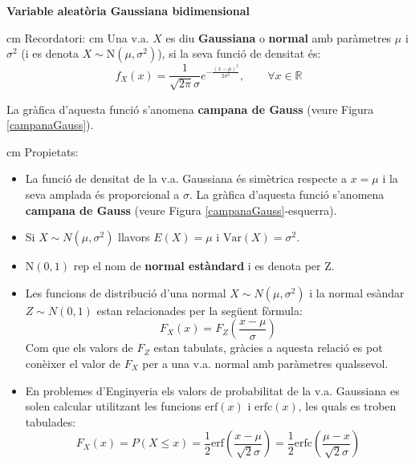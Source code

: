 \documentclass{article}
\newcommand\R{\mathbb{R}}
\begin{document}
\noindent
\textbf{\large Variable aleat\`oria Gaussiana bidimensional}

 cm
\noindent
Recordatori:
 cm
Una v.a. $X$ es diu \textbf{Gaussiana} o \textbf{normal} amb par\`ametres $\mu$ i $\sigma^2$
(i es denota $X \sim \mathrm{N}(\mu, \sigma^2)$), si la seva funci\'o de densitat \'es:
\[
f_X(x)=\frac{1}{\sqrt{2\pi}\sigma}e^{-\frac{(x-\mu)^2}{2 \sigma^2}} , 
\qquad \forall x \in \R
\]

\noindent
La gr\`afica d'aquesta funci\'o s'anomena {\bf campana de Gauss} (veure Figura \ref{campanaGauss}).

 cm
\noindent
Propietats:
\begin{itemize}
\item La funci\'o de densitat de la v.a. Gaussiana \'es sim\`etrica respecte a $x=\mu$ i la seva
amplada \'es proporcional a $\sigma$. La gr\`afica d'aquesta funci\'o s'anomena 
{\bf campana de Gauss} (veure Figura \ref{campanaGauss}-esquerra).

\item Si $X \sim N(\mu, \sigma^2)$ llavors $E(X)=\mu$ i $\mathrm{Var}(X)=\sigma^2$.

\item $\mathrm{N}(0, 1)$ rep el nom de {\bf normal est\`andard} i es denota per $\mathrm{Z}$.

\item Les funcions de distribuci\'o d'una normal $X \sim N(\mu, \sigma^2)$ i
la normal es\`andar $Z \sim N(0, 1)$ estan relacionades per la seg\"uent f\`ormula:
\[
F_X(x)=F_Z(\frac{x-\mu}{\sigma})
\]
Com que els valors de $F_Z$ estan tabulats, gr\`acies a aquesta relaci\'o 
es pot con\`eixer el valor de $F_X$ per a una v.a. normal amb par\`ametres qualssevol.

\item En problemes d'Enginyeria els valors de probabilitat de la v.a. Gaussiana es 
solen calcular utilitzant les funcions $\mathrm{erf}(x)$ i $\mathrm{erfc}(x)$, 
les quals es troben tabulades:
\[
F_X(x)=P(X \leq x)=\frac{1}{2} \mathrm{erf}(\frac{x-\mu}{\sqrt{2} \sigma})=
\frac{1}{2} \mathrm{erfc}(\frac{\mu-x}{\sqrt{2} \sigma})
\]


\end{itemize}
\end{document}
